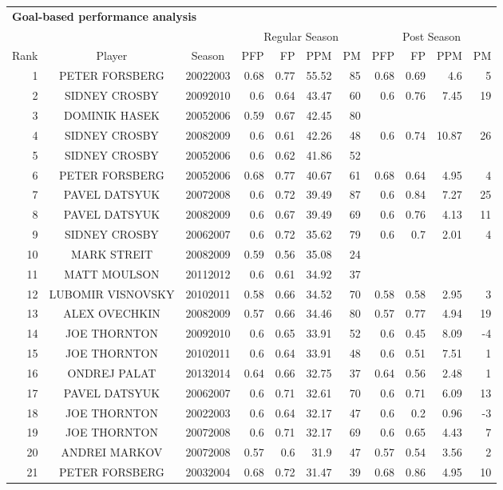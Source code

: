 \begin{table}[p]
        \centering\small
        \begin{tabular}{r c c |r r r r |r r r r }
        \multicolumn{9}{l}{\bf Goal-based performance analysis}\\
            & & & \multicolumn{4}{|c}{Regular Season} & \multicolumn{4}{|c}{Post Season}\\
            Rank & Player & Season  & PFP & FP & PPM & PM & PFP & FP & PPM & PM  \\ \hline
            \rule{0pt}{4ex} 
1&PETER FORSBERG&20022003&0.68&0.77&55.52&85&0.68&0.69&4.6&5\\
2&SIDNEY CROSBY&20092010&0.6&0.64&43.47&60&0.6&0.76&7.45&19\\
3&DOMINIK HASEK&20052006&0.59&0.67&42.45&80&&&&\\
4&SIDNEY CROSBY&20082009&0.6&0.61&42.26&48&0.6&0.74&10.87&26\\
5&SIDNEY CROSBY&20052006&0.6&0.62&41.86&52&&&&\\
6&PETER FORSBERG&20052006&0.68&0.77&40.67&61&0.68&0.64&4.95&4\\
7&PAVEL DATSYUK&20072008&0.6&0.72&39.49&87&0.6&0.84&7.27&25\\
8&PAVEL DATSYUK&20082009&0.6&0.67&39.49&69&0.6&0.76&4.13&11\\
9&SIDNEY CROSBY&20062007&0.6&0.72&35.62&79&0.6&0.7&2.01&4\\
10&MARK STREIT&20082009&0.59&0.56&35.08&24&&&&\\
11&MATT MOULSON&20112012&0.6&0.61&34.92&37&&&&\\
12&LUBOMIR VISNOVSKY&20102011&0.58&0.66&34.52&70&0.58&0.58&2.95&3\\
13&ALEX OVECHKIN&20082009&0.57&0.66&34.46&80&0.57&0.77&4.94&19\\
14&JOE THORNTON&20092010&0.6&0.65&33.91&52&0.6&0.45&8.09&-4\\
15&JOE THORNTON&20102011&0.6&0.64&33.91&48&0.6&0.51&7.51&1\\
16&ONDREJ PALAT&20132014&0.64&0.66&32.75&37&0.64&0.56&2.48&1\\
17&PAVEL DATSYUK&20062007&0.6&0.71&32.61&70&0.6&0.71&6.09&13\\
18&JOE THORNTON&20022003&0.6&0.64&32.17&47&0.6&0.2&0.96&-3\\
19&JOE THORNTON&20072008&0.6&0.71&32.17&69&0.6&0.65&4.43&7\\
20&ANDREI MARKOV&20072008&0.57&0.6&31.9&47&0.57&0.54&3.56&2\\
21&PETER FORSBERG&20032004&0.68&0.72&31.47&39&0.68&0.86&4.95&10\\

\end{tabular}
\end{table}
